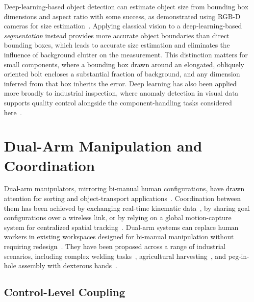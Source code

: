 Deep-learning-based object detection can estimate object size from bounding box dimensions and
aspect ratio with some success, as demonstrated using RGB-D cameras for size
estimation~\citep{wang2017tree}. Applying classical vision to a deep-learning-based
\emph{segmentation} instead provides more accurate object boundaries than direct bounding boxes,
which leads to accurate size estimation and eliminates the influence of background clutter on the
measurement. This distinction matters for small components, where a bounding box drawn around an elongated, obliquely oriented bolt encloses a substantial fraction of background, and any dimension inferred from that box inherits the error. Deep learning has also been applied more broadly to industrial inspection, where anomaly detection in visual data supports quality control alongside the component-handling tasks considered here~\citep{shukla2025anomaly}.

\section{Dual-Arm Manipulation and Coordination}\label{sec:lit_dualarm}

Dual-arm manipulators, mirroring bi-manual human configurations, have drawn attention for sorting
and object-transport applications~\citep{smith2012dual,makris2017dual}. Coordination between them
has been achieved by exchanging real-time kinematic data~\citep{ortenzi2018dual}, by sharing goal
configurations over a wireless link, or by relying on a global motion-capture system for centralized
spatial tracking~\citep{sk2025sharedvision}. Dual-arm systems can replace human workers in existing workspaces designed for bi-manual manipulation without requiring redesign~\citep{sk2025distance}. They have been proposed across a range of industrial scenarios, including complex welding tasks~\citep{gan2019multi}, agricultural harvesting~\citep{sepulveda2020robotic}, and peg-in-hole assembly with dexterous hands~\citep{lee2022peg}.

\subsection{Control-Level Coupling}\label{subsec:lit_coupling}

